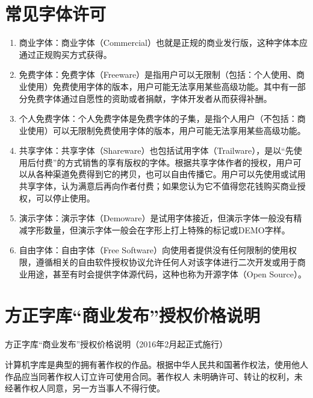\documentclass{../../PublicResources/DocClass}
\begin{document}
    \nocite{*} %
    \printbibliography %

    \appendix
    \chapter{常见字体许可}
    \begin{enumerate}
        \item 商业字体：商业字体（Commercial）也就是正规的商业发行版，这种字体本应通过正规购买方式获得。

        \item 免费字体：免费字体（Freeware）是指用户可以无限制（包括：个人使用、商业使用）免费使用字体的版本，用户可能无法享用某些高级功能。其中有一部分免费字体通过自愿性的资助或者捐献，字体开发者从而获得补酬。

        \item 个人免费字体：个人免费字体是免费字体的子集，是指个人用户（不包括：商业使用）可以无限制免费使用字体的版本，用户可能无法享用某些高级功能。

        \item 共享字体：共享字体（Shareware）也包括试用字体（Trailware），是以“先使用后付费”的方式销售的享有版权的字体。根据共享字体作者的授权，用户可以从各种渠道免费得到它的拷贝，也可以自由传播它。用户可以先使用或试用共享字体，认为满意后再向作者付费；如果您认为它不值得您花钱购买商业授权，可以停止使用。

        \item 演示字体：演示字体（Demoware）是试用字体接近，但演示字体一般没有精减字形数量，但演示字体一般会在字形上打上特殊的标记或DEMO字样。

        \item 自由字体：自由字体（Free Software）向使用者提供没有任何限制的使用权限，遵循相关的自由软件授权协议允许任何人对该字体进行二次开发或用于商业用途，甚至有时会提供字体源代码，这种也称为开源字体（Open Source）。

    \end{enumerate}

    \chapter{方正字库“商业发布”授权价格说明}
    方正字库“商业发布”授权价格说明（2016年2月起正式施行）

    计算机字库是典型的拥有著作权的作品。根据中华人民共和国著作权法，使用他人作品应当同著作权人订立许可使用合同。著作权人 未明确许可、转让的权利，未经著作权人同意，另一方当事人不得行使。
\end{document}
